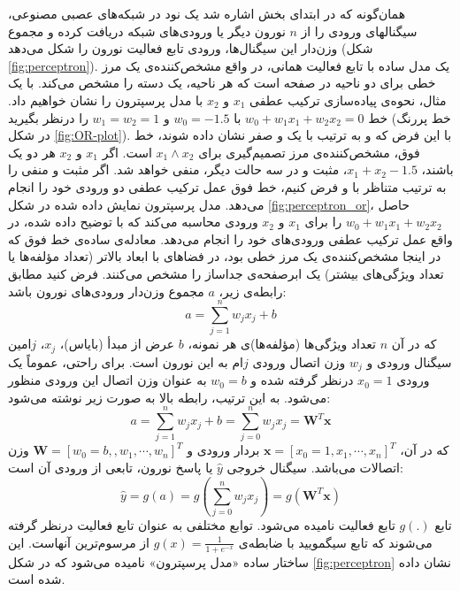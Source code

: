 \documentclass[11pt, twoside]{imsproc}
\let\LTRfootnote\footnoteA
\begin{document}
همان‌گونه که در ابتدای بخش اشاره شد یک نود در شبکه‌های عصبی مصنوعی، سیگنالهای ورودی را از $n$‌ نورون دیگر یا ورودی‌های شبکه دریافت کرده و مجموع وزن‌دار این سیگنال‌ها، ورودی تابع فعالیت
  نورون را شکل می‌دهد (شکل
\ref{fig:perceptron}).
  یک مدل ساده با تابع فعالیت همانی، در واقع مشخص‌کننده‌ی یک مرز خطی برای دو ناحیه در صفحه است که هر ناحیه، یک دسته را مشخص می‌کند. با یک مثال، نحوه‌ی پیاده‌سازی ترکیب عطفی
  $x_1$
  و
  $x_2$
با مدل پرسپترون را نشان خواهیم داد.
خط
$w_0+w_1x_1+w_2x_2=0$
با
$w_0=-1.5$
و
$w_1=w_2=1$
را درنظر بگیرید (خط پررنگ در شکل
 \ref{fig:OR-plot}).
  با این فرض که
و
به ترتیب با یک و صفر نشان داده شوند، خط فوق، مشخص‌کننده‌ی مرز تصمیم‌گیری برای
$x_1 \wedge x_2$
 است.
اگر
$x_1$
و
$x_2$
هر دو یک
  باشند،
$x_1+x_2-1.5$،
مثبت و در سه حالت دیگر، منفی خواهد شد. اگر مثبت و منفی را به ترتیب متناظر با
و
 فرض کنیم، خط فوق عمل ترکیب عطفی دو ورودی خود را انجام می‌دهد.
 مدل پرسپترون نمایش داده شده در شکل
 \ref{fig:perceptron_or}، 
 حاصل 
 $w_0+w_1x_1+w_2x_2$
 را برای 
 $x_1$
 و
 $x_2$
ورودی محاسبه می‌کند که با توضیح داده شده،‌ در واقع عمل ترکیب عطفی ورودی‌های خود را انجام می‌دهد. 
معادله‌ی ساده‌ی خط فوق که در اینجا مشخص‌کننده‌ی یک مرز خطی بود، در فضاهای با ابعاد بالاتر (تعداد مؤلفه‌ها یا تعداد ویژگی‌های بیشتر) یک ابرصفحه‌ی جداساز را مشخص می‌کنند.
    فرض کنید مطابق رابطه‌ی زیر،
    $a$
     مجموع وزن‌دار ورودی‌های نورون باشد:
  \begin{equation}
  \label{eq:noronIn}
  a=\sum_{j=1}^n w_j x_j+b
\end{equation}
که در آن
$n$
تعداد ویژگی‌ها (مؤلفه‌ها)ی هر نمونه،
    $b$
عرض از مبدأ (بایاس)،
 $x_j$،
$j$امین
سیگنال ورودی و
$w_j$
وزن اتصال ورودی $j$ام به این نورون است.
برای راحتی، عموماً یک ورودی
 $x_0=1$
 درنظر گرفته شده و
$w_0=b$
به عنوان وزن اتصال این ورودی منظور می‌شود. به این ترتیب، رابطه بالا به صورت زیر نوشته می‌شود:
\begin{equation}
  a=\sum_{j=1}^n w_j x_j+b=\sum_{j=0}^n w_j x_j=\mathbf{W}^T{\mathbf{x}}
\end{equation}
که در آن، 
    ${\mathbf{x}}=[x_0=1,x_1,\cdots,x_n]^T$
بردار ورودی و
      $\mathbf{W}=[w_0=b,,w_1,\cdots,w_n]^T$
وزن اتصالات می‌باشد.
سیگنال خروجی
$\hat{y}$
یا پاسخ نورون،‌ تابعی از ورودی آن است:
\begin{equation} 	
  \hat{y}=g(a)=g\left(\sum_{j=0}^n w_j x_j\right)=g(\mathbf{W}^T{\mathbf{x}})
\end{equation}
تابع $g(.)$ تابع فعالیت نامیده می‌شود. توابع مختلفی به عنوان تابع فعالیت درنظر گرفته می‌شوند که تابع سیگمویید با ضابطه‌ی
$g(x)=\frac{1}{1+e^{-x}}$
از مرسوم‌ترین آنهاست.
این ساختار ساده «مدل پرسپترون» نامیده می‌شود که در
شکل
\ref{fig:perceptron}
نشان داده شده است.
\end{document}
